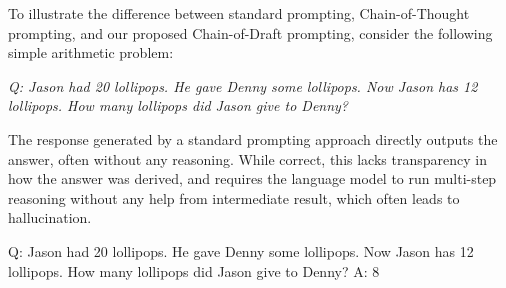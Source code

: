 \begin{comment}
\begin{figure}[h!]
\centering
\begin{promptbox}[Standard]
Q: Jason had 20 lollipops. He gave Denny some lollipops. Now Jason has 12
lollipops. How many lollipops did Jason give to Denny?
\newline
A: 8
\end{promptbox}
\begin{promptbox}[Chain-of-Thought]
Q: Jason had 20 lollipops. He gave Denny some lollipops. Now Jason has 12
lollipops. How many lollipops did Jason give to Denny?
\newline
A: Jason started with 20 lollipops. Then he had 12 after giving some to Denny.
So he gave Denny 20 - 12 = 8. \#\#\#\# 8
\end{promptbox}
\begin{promptbox}[Chain-of-Draft]
Q: Jason had 20 lollipops. He gave Denny some lollipops. Now Jason has 12
lollipops. How many lollipops did Jason give to Denny?
\newline
A: 20 - x = 12; x = 20 - 12 = 8. \#\#\#\# 8
\end{promptbox}
\caption{Example input-output pairs for standard prompting, chain of thought, and chain of draft.}
\label{fig:cod_vs_cot}
\end{figure}
\end{comment}

To illustrate the difference between standard prompting, Chain-of-Thought prompting, and our proposed Chain-of-Draft prompting, consider the following simple arithmetic problem:

\noindent\textit{Q: Jason had 20 lollipops. He gave Denny some lollipops. Now Jason has 12 lollipops. How many lollipops did Jason give to Denny?}

The response generated by a standard prompting approach directly outputs the answer, often without any reasoning. While correct, this lacks transparency in how the answer was derived, and requires the language model to run multi-step reasoning without any help from intermediate result, which often leads to hallucination.

\begin{center}
\begin{promptbox}[Standard]
Q: Jason had 20 lollipops. He gave Denny some lollipops. Now Jason has 12
lollipops. How many lollipops did Jason give to Denny?
\newline
A: 8
\end{promptbox}
\end{center}


